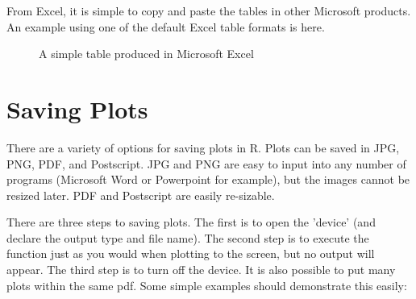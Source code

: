\documentclass[a4paper,11pt]{article}\usepackage[]{graphicx}\usepackage[]{color}
\begin{document}
From Excel, it is simple to copy and paste the tables in other Microsoft products. An example using one of the default Excel table formats is here.

\begin{figure}[ht!]
\centering
\caption{A simple table produced in Microsoft Excel}
\label{overflow}
\end{figure}

\section{Saving Plots}
\label{app:savingPlots}
There are a variety of options for saving plots in R. Plots can be saved in JPG, PNG, PDF, and Postscript. JPG and PNG are easy to input into any number of programs (Microsoft Word or Powerpoint for example), but the images cannot be resized later. PDF and Postscript are easily re-sizable.

There are three steps to saving plots. The first is to open the 'device' (and declare the output type and file name). The second step is to execute the function just as you would when plotting to the screen, but no output will appear. The third step is to turn off the device. It is also possible to put many plots within the same pdf.  Some simple examples should demonstrate this easily:
\end{document}
